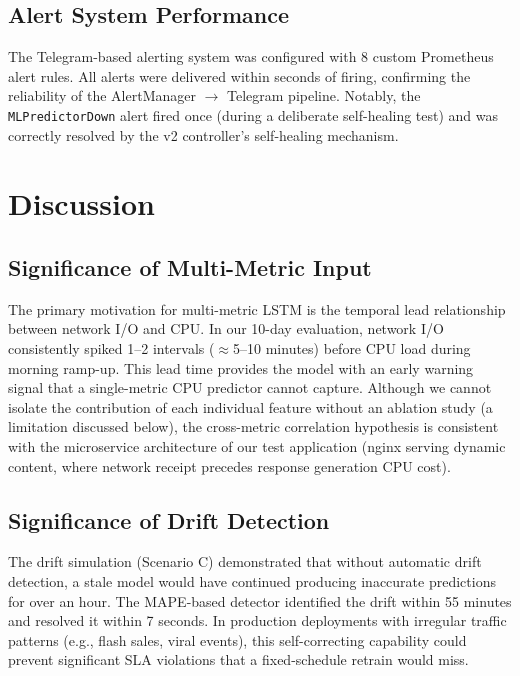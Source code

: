 \documentclass[journal]{IEEEtran}
\begin{document}
\subsection{Alert System Performance}
The Telegram-based alerting system was configured with 8 custom Prometheus alert rules. All alerts were delivered within seconds of firing, confirming the reliability of the AlertManager $\to$ Telegram pipeline. Notably, the \texttt{MLPredictorDown} alert fired once (during a deliberate self-healing test) and was correctly resolved by the v2 controller's self-healing mechanism.

\section{Discussion}
\label{sec:discussion}

\subsection{Significance of Multi-Metric Input}
The primary motivation for multi-metric LSTM is the temporal lead relationship between network I/O and CPU. In our 10-day evaluation, network I/O consistently spiked 1--2 intervals ($\approx$5--10 minutes) before CPU load during morning ramp-up. This lead time provides the model with an early warning signal that a single-metric CPU predictor cannot capture. Although we cannot isolate the contribution of each individual feature without an ablation study (a limitation discussed below), the cross-metric correlation hypothesis is consistent with the microservice architecture of our test application (nginx serving dynamic content, where network receipt precedes response generation CPU cost).

\subsection{Significance of Drift Detection}
The drift simulation (Scenario C) demonstrated that without automatic drift detection, a stale model would have continued producing inaccurate predictions for over an hour. The MAPE-based detector identified the drift within 55 minutes and resolved it within 7 seconds. In production deployments with irregular traffic patterns (e.g., flash sales, viral events), this self-correcting capability could prevent significant SLA violations that a fixed-schedule retrain would miss.
\end{document}
